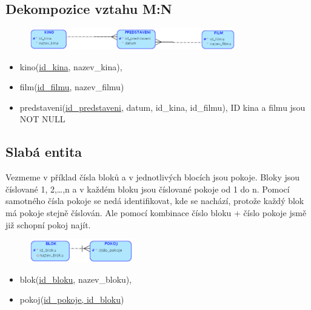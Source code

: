 \documentclass{szzclass}
\begin{document}
\subsection{Dekompozice vztahu M:N}
\begin{figure}[h!]
    \centering
    \includegraphics[width=0.8\textwidth]{topics/bi-wsi-si-02/images/decoMToN.png}
\end{figure}
\begin{itemize}
    \item kino(\underline{id\_kina}, nazev\_kina),
    \item film(\underline{id\_filmu}, nazev\_filmu)
    \item predstaveni(\underline{id\_predstaveni}, datum, id\_kina, id\_filmu), ID kina a filmu jsou NOT NULL
\end{itemize}


\subsection{Slabá entita}
Vezmeme v příklad čísla bloků a v jednotlivých blocích jsou pokoje. Bloky jsou číslované 1, 2,\dots,n a v každém bloku jsou číslované
pokoje od 1 do n. Pomocí samotného čísla pokoje se nedá identifikovat, kde se nachází, protože každý blok má pokoje stejně číslován.
Ale pomocí kombinace číslo bloku + číslo pokoje jsmě již schopní pokoj najít.
\begin{figure}[h!]
    \centering
    \includegraphics[width=0.4\textwidth]{topics/bi-wsi-si-02/images/weakEntity.png}
\end{figure}
\begin{itemize}
    \item blok(\underline{id\_bloku}, nazev\_bloku),
    \item pokoj(\underline{id\_pokoje, id\_bloku})
\end{itemize}
\end{document}
